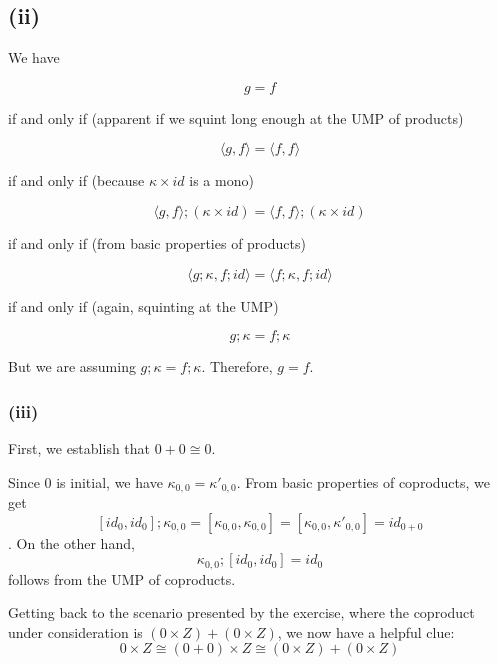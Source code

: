 \documentclass{article}
\begin{document}
\subsection*{(ii)}

We have 

$$ g = f $$

if and only if (apparent if we squint long enough at the UMP of products)

$$\langle g , f \rangle = \langle f, f \rangle$$

if and only if (because $\kappa \times id$ is a mono)

$$\langle g, f \rangle;(\kappa \times id) = \langle f, f \rangle;(\kappa \times id)$$

if and only if (from basic properties of products)

$$\langle g;\kappa, f;id \rangle = \langle f;\kappa, f;id \rangle$$

if and only if (again, squinting at the UMP)

$$ g;\kappa = f;\kappa $$

But we are assuming $g;\kappa = f;\kappa$. Therefore, $g = f$.

\subsubsection*{(iii)}

First, we establish that $0 + 0 \cong 0$.


Since $0$ is initial, we have $\kappa_{0,0} = \kappa'_{0,0}$. From basic properties of coproducts, we get 
$$[id_0,id_0];\kappa_{0,0} = [\kappa_{0,0},\kappa_{0,0}] = [\kappa_{0,0}, \kappa'_{0,0}] = id_{0 + 0}$$.
On the other hand,
$$\kappa_{0,0};[id_0,id_0] = id_{0}$$
follows from the UMP of coproducts.

Getting back to the scenario presented by the exercise, where the coproduct under consideration is 
$(0 \times Z) + (0 \times Z)$, we now have a helpful clue:
$$0 \times Z \cong (0 + 0) \times Z \cong (0 \times Z) + (0 \times Z)$$ 


\end{document}

